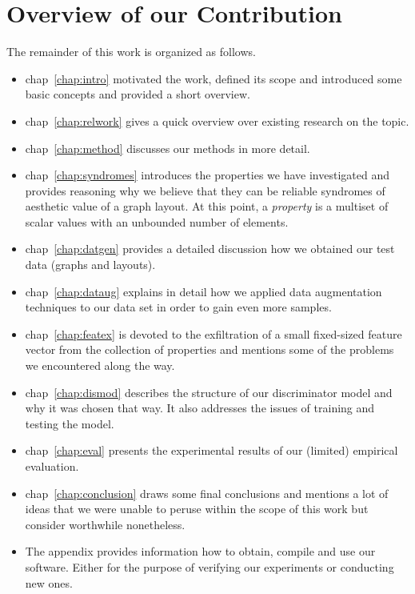 \documentclass{graphstudy}
\begin{document}
\section{Overview of our Contribution}
\label{sec:overview}

The remainder of this work is organized as follows.
\begin{itemize}
\item\Acl{chap}~\ref{chap:intro} motivated the work, defined its scope and introduced some basic concepts and provided a
  short overview.
\item\Acl{chap}~\ref{chap:relwork} gives a quick overview over existing research on the topic.
\item\Acl{chap}~\ref{chap:method} discusses our methods in more detail.
\item\Acl{chap}~\ref{chap:syndromes} introduces the properties we have investigated and provides reasoning why we
  believe that they can be reliable syndromes of aesthetic value of a graph layout.  At this point, a \emph{property} is
  a multiset of scalar values with an unbounded number of elements.
\item\Acl{chap}~\ref{chap:datgen} provides a detailed discussion how we obtained our test data (graphs and layouts).
\item\Acl{chap}~\ref{chap:dataug} explains in detail how we applied data augmentation techniques to our data set in
  order to gain even more samples.
\item\Acl{chap}~\ref{chap:featex} is devoted to the exfiltration of a small fixed-sized feature vector from the
  collection of properties and mentions some of the problems we encountered along the way.
\item\Acl{chap}~\ref{chap:dismod} describes the structure of our discriminator model and why it was chosen that way.  It
  also addresses the issues of training and testing the model.
\item\Acl{chap}~\ref{chap:eval} presents the experimental results of our (limited) empirical evaluation.
\item\Acl{chap}~\ref{chap:conclusion} draws some final conclusions and mentions a lot of ideas that we were unable to
  peruse within the scope of this work but consider worthwhile nonetheless.
\item The appendix provides information how to obtain, compile and use our software.  Either for the purpose of
  verifying our experiments or conducting new ones.
\end{itemize}
\end{document}
